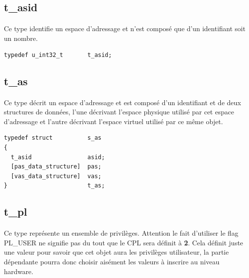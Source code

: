 \documentclass[10pt,a4wide]{article}
\begin{document}
\subsection{t\_asid}

\paragraph{}

Ce type identifie un espace d'adressage et n'est compos\'e que
d'un identifiant soit un nombre.

\begin{verbatim}
typedef u_int32_t       t_asid;
\end{verbatim}

\subsection{t\_as}

\paragraph{}

Ce type d\'ecrit un espace d'adressage et est compos\'e d'un identifiant et
de deux structures de donn\'ees, l'une d\'ecrivant l'espace physique utilis\'e
par cet espace d'adressage et l'autre d\'ecrivant l'espace virtuel utilis\'e
par ce m\^eme objet.

\begin{verbatim}
typedef struct          s_as
{
  t_asid                asid;
  [pas_data_structure]  pas;
  [vas_data_structure]  vas;
}                       t_as;
\end{verbatim}

\subsection{t\_pl}

\paragraph{}

Ce type repr\'esente un ensemble de privil\`eges. Attention le fait
d'utiliser le flag PL\_USER ne signifie pas du tout que le CPL sera
d\'efinit \`a \textbf{2}. Cela d\'efinit juste une valeur pour savoir
que cet objet aura les privil\`eges utilisateur, la partie d\'ependante
pourra donc choisir ais\'ement les valeurs \`a inscrire au niveau hardware.
\end{document}
